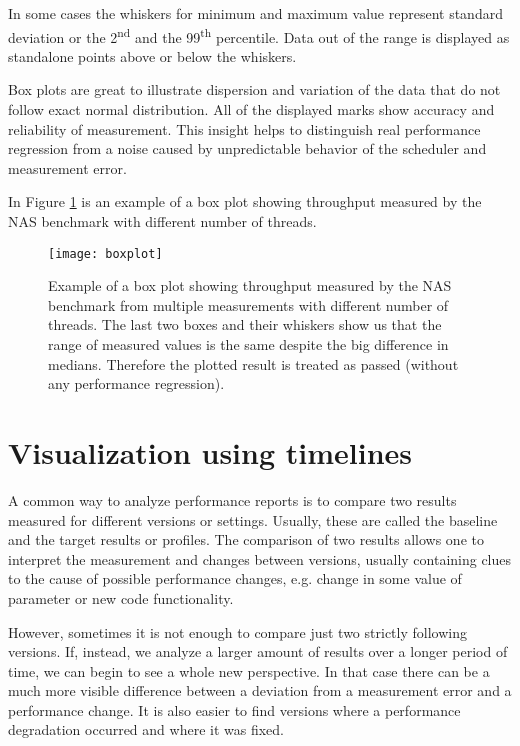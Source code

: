 In some cases the whiskers for minimum and maximum value represent standard
deviation or the 2\textsuperscript{nd} and the 99\textsuperscript{th} percentile. Data
out of the range is displayed as standalone points above or below the whiskers.

Box plots are great to illustrate dispersion and variation of the data that do not
follow exact normal distribution. All of the displayed marks show accuracy and
reliability of measurement. This insight helps to distinguish real performance
regression from a noise caused by unpredictable behavior of the scheduler and
measurement error.

In Figure \ref{fig:boxplot} is an example of a box plot showing throughput
measured by the NAS benchmark with different number of threads.  

\begin{figure}
  \centering
  \texttt{[image: boxplot]}
  \caption{Example of a box plot showing throughput measured by the NAS
    benchmark from multiple measurements with different number of threads. The
    last two boxes and their whiskers show us that the range of measured values
    is the same despite the big difference in medians. Therefore the plotted
    result is treated as passed (without any performance regression).}
  \label{fig:boxplot}
\end{figure}



\chapter{Visualization using timelines} \label{ch:timelines}
A common way to analyze performance reports is to compare two results measured
for different versions or settings. Usually, these are called the baseline and
the target results or profiles. The comparison of two results allows one to
interpret the measurement and changes between versions, usually containing clues
to the cause of possible performance changes, e.g. change in some value of
parameter or new code functionality.

However, sometimes it is not enough to compare just two strictly following
versions. If, instead, we analyze a larger amount of results over a longer period
of time, we can begin to see a whole new perspective. In that case there can be
a much more visible difference between a deviation from a measurement error and
a performance change. It is also easier to find versions where a
performance degradation occurred and where it was fixed.

